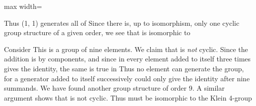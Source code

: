 \documentclass[11pt,oneside]{article}
\begin{document}
\begin{BookBody}
\begin{center}\begin{adjustbox}{max width=\linewidth}\end{adjustbox}\end{center}

\noindent Thus (1, 1) generates all of  Since there is, up to isomorphism, only one cyclic group structure of a given order, we see that  is isomorphic to \BookEnd{\blacktriangle}

 Consider  This is a group of nine elements. We claim that  is\textit{ not} cyclic. Since the addition is by components, and since in  every element added to itself three times gives the identity, the same is true in  Thus no element can generate the group, for a generator added to itself successively could only give the identity after nine 
summands. We have found another group structure of order 9. A similar argument shows that  is not cyclic. Thus  must be isomorphic to the Klein 4-group\BookEnd{\blacktriangle}

\end{BookBody}

\BookNarrativetrue
\end{document}
